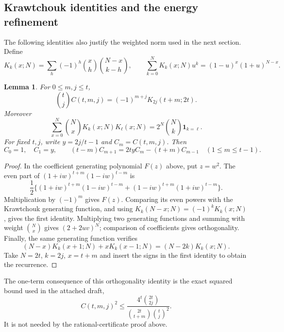 \documentclass[11pt,a4paper]{article}
\newtheorem{lemma}[theorem]{Lemma}
\theoremstyle{definition}
\theoremstyle{remark}
\numberwithin{equation}{section}
\begin{document}
\subsection{Krawtchouk identities and the energy refinement}

The following identities also justify the weighted norm used in the next
section. Define
\[
 K_k(x;N)=\sum_h(-1)^h\binom xh\binom{N-x}{k-h},\qquad
 \sum_{k=0}^NK_k(x;N)u^k=(1-u)^x(1+u)^{N-x}.
\]
\begin{lemma}\label{p8:cba:kraw}
For $0\le m,j\le t$,
\[
 \binom tjC(t,m,j)=(-1)^{m+j}K_{2j}(t+m;2t).
\]
Moreover
\[
 \sum_{x=0}^N\binom NxK_k(x;N)K_\ell(x;N)
                       =2^N\binom Nk\mathbf1_{k=\ell}.
\]
For fixed $t,j$, write $y=2j/t-1$ and $C_m=C(t,m,j)$. Then
\[
 C_0=1,\quad C_1=y,\qquad
 (t-m)C_{m+1}=2tyC_m-(t+m)C_{m-1}
                           \quad(1\le m\le t-1).
\]
\end{lemma}
\begin{proof}
In the coefficient generating polynomial $F(z)$ above, put $z=w^2$.
The even part of $(1+iw)^{t+m}(1-iw)^{t-m}$ is
\[
 \frac12\{(1+iw)^{t+m}(1-iw)^{t-m}
          +(1-iw)^{t+m}(1+iw)^{t-m}\}.
\]
Multiplication by $(-1)^m$ gives $F(z)$. Comparing its even powers
with the Krawtchouk generating function, and using
$K_k(N-x;N)=(-1)^kK_k(x;N)$, gives the first identity.
Multiplying two generating functions and summing with weight
$\binom Nx$ gives $(2+2uv)^N$; comparison of coefficients gives
orthogonality. Finally, the same generating function verifies
\[
 (N-x)K_k(x+1;N)+xK_k(x-1;N)=(N-2k)K_k(x;N).
\]
Take $N=2t$, $k=2j$, $x=t+m$ and insert the signs in the first
identity to obtain the recurrence.
\end{proof}

The one-term consequence of this orthogonality identity is the
exact squared bound used in the attached draft,
\[
 C(t,m,j)^2\le
       \frac{4^t\binom{2t}{2j}}
            {\binom{2t}{t+m}\binom tj^2}.
\]
It is not needed by the rational-certificate proof above.
\end{document}
